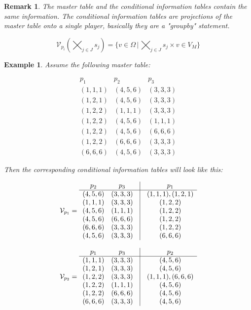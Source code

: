 \documentclass{article}
\newtheorem{remark}{Remark}[section]
\newtheorem{example}{Example}[section]
\begin{document}
\begin{remark}

The master table and the conditional information tables contain the same information. The conditional information tables are projections of the master table onto a single player, basically they are a "groupby" statement.

\[ \mathcal{V}_{p_i}(\bigtimes_{j \in J} s_j) = \{ v \in \Omega \, | \, \bigtimes_{j \in J} s_j \times v \in V_M \} \]

\end{remark}

\begin{example}

Assume the following master table:

\begin{equation*}
\begin{array}{ccc}
p_1 & p_2 & p_3 \\ \hline
(1,1,1) & (4,5,6) & (3,3,3) \\
(1,2,1) & (4,5,6) & (3,3,3) \\
(1,2,2) & (1,1,1) & (3,3,3) \\
(1,2,2) & (4,5,6) & (1,1,1) \\
(1,2,2) & (4,5,6) & (6,6,6) \\
(1,2,2) & (6,6,6) & (3,3,3) \\
(6,6,6) & (4,5,6) & (3,3,3)
\end{array} 
\end{equation*}

Then the corresponding conditional information tables will look like this:

\[ \left. \mathcal{V}_{p_1} = \right. 
\begin{array}{cccc}
p_2 & p_3 & \vline & p_1 \\ \hline
(4,5,6) & (3,3,3) & \vline & (1,1,1), (1,2,1) \\
(1,1,1) & (3,3,3) & \vline & (1,2,2) \\
(4,5,6) & (1,1,1) & \vline & (1,2,2) \\
(4,5,6) & (6,6,6) & \vline & (1,2,2) \\
(6,6,6) & (3,3,3) & \vline & (1,2,2) \\
(4,5,6) & (3,3,3) & \vline & (6,6,6)
\end{array} 
\]

\[ \left. \mathcal{V}_{p_2} = \right. 
\begin{array}{cccc}
p_1 & p_3 & \vline & p_2 \\ \hline
(1,1,1) & (3,3,3) & \vline & (4,5,6) \\
(1,2,1) & (3,3,3) & \vline & (4,5,6) \\
(1,2,2) & (3,3,3) & \vline & (1,1,1),(6,6,6) \\
(1,2,2) & (1,1,1) & \vline & (4,5,6) \\
(1,2,2) & (6,6,6) & \vline & (4,5,6) \\
(6,6,6) & (3,3,3) & \vline & (4,5,6)
\end{array} 
\]


\end{example}
\end{document}
